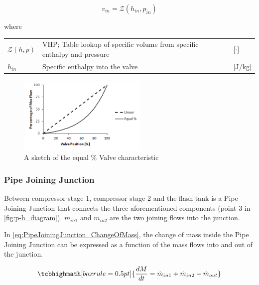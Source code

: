 \begin{equation} \label{eq:ExpansionValve_vin}
	v_{in} = \mathcal{Z}(h_{in}, p_{in})
\end{equation}

where
\smallskip
\begin{center}
	\begin{tabular}{l p{10cm} l}
		$\mathcal{Z}(h, p)$ & VHP; Table lookup of specific volume from specific enthalpy and pressure & [$\cdot$] \\
		$h_{in}$            & Specific enthalpy into the valve                                    & [\si{J}/\si{kg}]
	\end{tabular}
\end{center}

\begin{figure}[h!]
	\centering
	\includegraphics[width=0.55\textwidth]{Graphics/Equal-percentage.png}
	\caption{A sketch of the equal \% Valve characteristic}
	\label{fig:equal_percent_valve}
\end{figure}

\newpage

\subsubsection{Pipe Joining Junction}\label{sec:pipe-joining-junction}
Between compressor stage 1, compressor stage 2 and the flash tank is a Pipe Joining Junction that connects the three aforementioned components (point 3 in \cref{fig:p-h_diagram}). $\dot{m}_{in1}$ and $\dot{m}_{in2}$ are the two joining flows into the junction.

In \cref{eq:PipeJoiningJunction_ChangeOfMass}, the change of mass inside the Pipe Joining Junction can be expressed as a function of the mass flows into and out of the junction.


\begin{equation}
	\tcbhighmath[boxrule = 0.5pt]{ \frac{dM}{dt} = \dot{m}_{in1} + \dot{m}_{in2} - \dot{m}_{out} }       \label{eq:PipeJoiningJunction_ChangeOfMass}
\end{equation}

